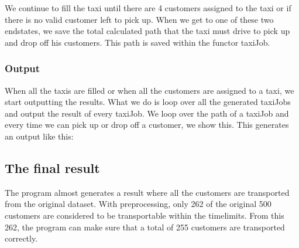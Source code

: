 \documentclass[10pt,a4paper]{article}
\begin{document}
We continue to fill the taxi until there are 4 customers assigned to the taxi or if there is no valid customer left to pick up. When we get to one of these two endstates, we save the total calculated path that the taxi must drive to pick up and drop off his customers. This path is saved within the functor taxiJob.

\subsubsection{Output}

When all the taxis are filled or when all the customers are assigned to a taxi, we start outputting the results. What we do is loop over all the generated taxiJobs and output the result of every taxiJob. We loop over the path of a taxiJob and every time we can pick up or drop off a customer, we show this. This generates an output like this:

\begin{quote}
\end{quote}

\subsection{The final result}
The program almost generates a result where all the customers are transported from the original dataset. With preprocessing, only 262 of the original 500 customers are considered to be transportable within the timelimits. From this 262, the program can make sure that a total of 255 customers are transported correctly.
\end{document}
